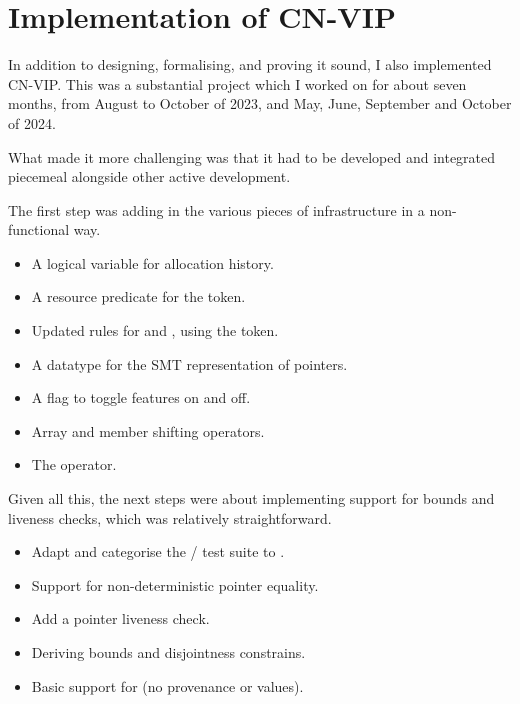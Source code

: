 \chapter{Implementation of CN-VIP}

\margintoc{}

In addition to designing, formalising, and proving it sound, I also implemented
CN-VIP\@. This was a substantial project which I worked on for about seven
months, from August to October of 2023, and May, June, September and October
of 2024.

What made it more challenging was that it had to be developed and integrated
piecemeal alongside other active  development.

The first step was adding in the various pieces of infrastructure in a non-functional way.
\begin{itemize}
    \item A logical variable for allocation history.
    \item A resource predicate for the  token.
    \item Updated rules for  and , using the  token.
    \item A datatype for the SMT representation of pointers.
    \item A flag to toggle  features on and off.
    \item Array and member shifting operators.
    \item The  operator.
\end{itemize}

Given all this, the next steps were about implementing support for bounds and
liveness checks, which was relatively straightforward.
\begin{itemize}
    \item Adapt and categorise the / test suite to \@.
    \item Support for non-deterministic pointer equality.
    \item Add a pointer liveness check.
    \item Deriving bounds and disjointness constrains.
    \item Basic support for  (no provenance or
         values).
\end{itemize}

